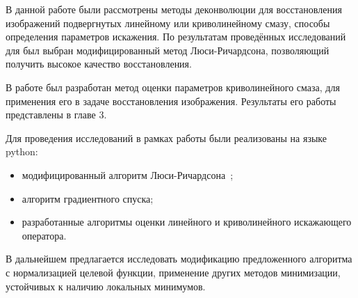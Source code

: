 \conclusion

В данной работе были рассмотрены методы деконволюции для восстановления изображений подвергнутых линейному или криволинейному смазу, способы определения параметров искажения. По результатам проведённых исследований для был выбран модифицированный метод Люси-Ричардсона, позволяющий получить высокое качество восстановления.

В работе был разработан метод оценки параметров криволинейного смаза, для применения его в задаче восстановления изображения. Результаты его работы представлены в главе 3.

Для проведения исследований в рамках работы были реализованы на языке python:
\begin{itemize}
	\item модифицированный алгоритм Люси-Ричардсона~\cite{richardsonLucyModifiedBiggs};
	\item алгоритм градиентного спуска;
	\item разработанные алгоритмы оценки линейного и криволинейного искажающего оператора.
\end{itemize}

В дальнейшем предлагается исследовать модификацию предложенного алгоритма с нормализацией целевой функции, применение других методов минимизации, устойчивых к наличию локальных минимумов.